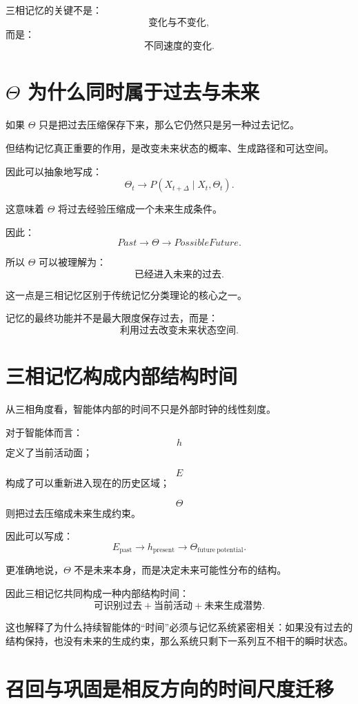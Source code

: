 三相记忆的关键不是：
\[
\text{变化与不变化},
\]
而是：
\[
\boxed{
\text{不同速度的变化}.
}
\]

\section{$\Theta$ 为什么同时属于过去与未来}

如果 $\Theta$ 只是把过去压缩保存下来，那么它仍然只是另一种过去记忆。

但结构记忆真正重要的作用，是改变未来状态的概率、生成路径和可达空间。

因此可以抽象地写成：
\[
\boxed{
\Theta_t
\rightarrow
P(X_{t+\Delta}\mid X_t,\Theta_t).
}
\]

这意味着 $\Theta$ 将过去经验压缩成一个未来生成条件。

因此：
\[
\boxed{
Past
\rightarrow
\Theta
\rightarrow
PossibleFuture.
}
\]

所以 $\Theta$ 可以被理解为：
\[
\boxed{
\text{已经进入未来的过去}.
}
\]

这一点是三相记忆区别于传统记忆分类理论的核心之一。

记忆的最终功能并不是最大限度保存过去，而是：
\[
\boxed{
\text{利用过去改变未来状态空间}.
}
\]

\section{三相记忆构成内部结构时间}

从三相角度看，智能体内部的时间不只是外部时钟的线性刻度。

对于智能体而言：
\[
h
\]
定义了当前活动面；

\[
E
\]
构成了可以重新进入现在的历史区域；

\[
\Theta
\]
则把过去压缩成未来生成约束。

因此可以写成：
\[
\boxed{
E_{\mathrm{past}}
\rightarrow
h_{\mathrm{present}}
\rightarrow
\Theta_{\mathrm{future\ potential}}.
}
\]

更准确地说，$\Theta$ 不是未来本身，而是决定未来可能性分布的结构。

因此三相记忆共同构成一种内部结构时间：
\[
\boxed{
\text{可识别过去}
+
\text{当前活动}
+
\text{未来生成潜势}.
}
\]

这也解释了为什么持续智能体的“时间”必须与记忆系统紧密相关：如果没有过去的结构保持，也没有未来的生成约束，那么系统只剩下一系列互不相干的瞬时状态。

\section{召回与巩固是相反方向的时间尺度迁移}

